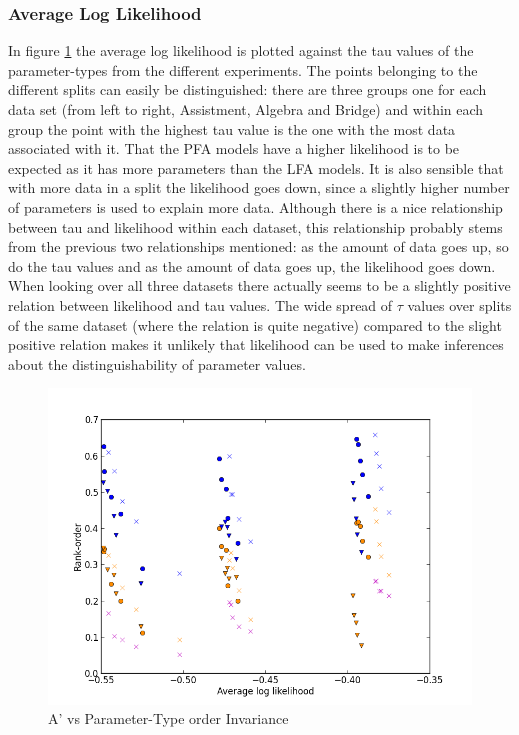 \documentclass{scrartcl}
\begin{document}

\subsubsection{Average Log Likelihood}
In figure \ref{fig:likely} the average log likelihood is plotted against the tau values of the parameter-types from the different experiments. The points belonging to the different splits can easily be distinguished: there are three groups one for each data set (from left to right, Assistment, Algebra and Bridge) and within each group the point with the highest tau value is the one with the most data associated with it. That the PFA models have a higher likelihood is to be expected as it has more parameters than the LFA models. It is also sensible that with more data in a split the likelihood goes down, since a slightly higher number of parameters is used to explain more data. Although there is a nice relationship between tau and likelihood within each dataset, this relationship probably stems from the previous two relationships mentioned: as the amount of data goes up, so do the tau values and as the amount of data goes up, the likelihood goes down. When looking over all three datasets there actually seems to be a slightly positive relation between likelihood and tau values. The wide spread of $\tau$ values over splits of the same dataset (where the relation is quite negative) compared to the slight positive relation makes it unlikely that likelihood can be used to make inferences about the distinguishability of parameter values.
\begin{figure}[h]
\centering
\includegraphics[width=140mm]{images/alllikely.png}
\caption{A' vs Parameter-Type order Invariance}
\label{fig:likely}
\end{figure}
\end{document}
